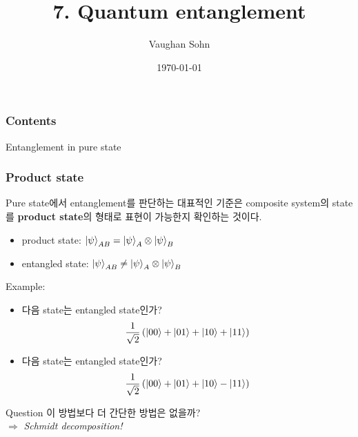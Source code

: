 \documentclass[9pt]{beamer}
\title{7. Quantum entanglement}
\date{\today}
\author{Vaughan Sohn}
\begin{document}
    \maketitle
    
    \begin{frame}
        \frametitle{Contents}
        \tableofcontents
    \end{frame}

    \begin{section}{Entanglement in pure state}
        \begin{frame}
            \frametitle{Product state}
            Pure state에서 entanglement를 판단하는 대표적인 기준은 composite system의 state를 \textbf{product state}의 형태로 표현이 가능한지 확인하는 것이다.
            \begin{itemize}
                \item product state: $\ket{\psi}_{AB} = \ket{\psi}_A \otimes \ket{\psi}_B$
                \item entangled state: $\ket{\psi}_{AB} \ne \ket{\psi}_A \otimes \ket{\psi}_B$
            \end{itemize}
            \vspace{0.4cm}
            Example:
            \begin{itemize}
                \item 다음 state는 entangled state인가?
                \begin{equation*}
                    \frac{1}{\sqrt 2} \left ( \ket{00} + \ket{01} + \ket{10} + \ket{11} \right)
                \end{equation*}
                \item 다음 state는 entangled state인가?
                \begin{equation*}
                    \frac{1}{\sqrt 2} \left ( \ket{00} + \ket{01} + \ket{10} - \ket{11} \right)
                \end{equation*} 
            \end{itemize}
            \begin{block}{Question}
                이 방법보다 더 간단한 방법은 없을까? \\
                $\Rightarrow$ \textit{Schmidt decomposition!}
            \end{block}
        \end{frame}
        

\end{section}
\end{document}
